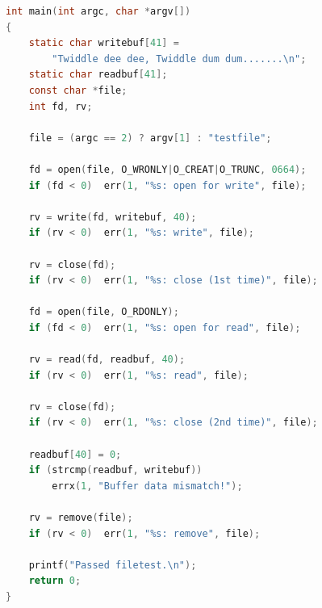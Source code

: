 \documentclass[11pt,a4paper]{article}
\begin{document}
\begin{lstlisting}[language=C,
  caption={\texttt{filetest} --- end-to-end I/O and removal test.}]
int main(int argc, char *argv[])
{
	static char writebuf[41] =
		"Twiddle dee dee, Twiddle dum dum.......\n";
	static char readbuf[41];
	const char *file;
	int fd, rv;

	file = (argc == 2) ? argv[1] : "testfile";

	fd = open(file, O_WRONLY|O_CREAT|O_TRUNC, 0664);
	if (fd < 0)  err(1, "%s: open for write", file);

	rv = write(fd, writebuf, 40);
	if (rv < 0)  err(1, "%s: write", file);

	rv = close(fd);
	if (rv < 0)  err(1, "%s: close (1st time)", file);

	fd = open(file, O_RDONLY);
	if (fd < 0)  err(1, "%s: open for read", file);

	rv = read(fd, readbuf, 40);
	if (rv < 0)  err(1, "%s: read", file);

	rv = close(fd);
	if (rv < 0)  err(1, "%s: close (2nd time)", file);

	readbuf[40] = 0;
	if (strcmp(readbuf, writebuf))
		errx(1, "Buffer data mismatch!");

	rv = remove(file);
	if (rv < 0)  err(1, "%s: remove", file);

	printf("Passed filetest.\n");
	return 0;
}
\end{lstlisting}
\end{document}

